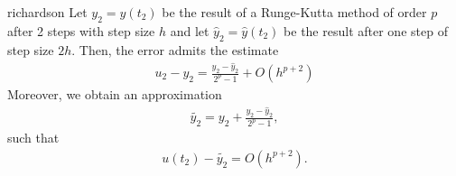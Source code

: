 \begin{Theorem}{richardson}
  Let $y_2 = y(t_2)$ be the result of a Runge-Kutta method of order
  $p$ after 2 steps with step size $h$ and let
  $\hat y_2 = \hat y(t_2)$ be the result after one step of step size
  $2h$. Then, the error admits the estimate
  \begin{gather}
    \label{eq:explicit:10}
    u_2 - y_2 = \frac{y_2 - \hat y_2}{2^p - 1} + O(h^{p+2})
  \end{gather}
  Moreover, we obtain an approximation
  \begin{gather}
    \label{eq:explicit:20}
    \tilde{y_2} = y_2 + \frac{y_2 - \hat y_2}{2^p - 1}  ,
  \end{gather}
  such that
  \begin{gather}
    \label{eq:richardson:1}
    u(t_2) - \tilde{y_2} = O(h^{p+2}).
  \end{gather}
\end{Theorem}

